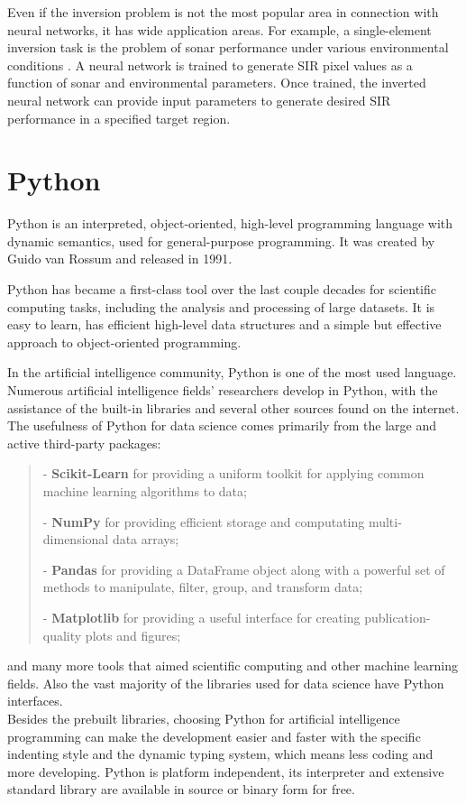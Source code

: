 Even if the inversion problem is not the most popular area in connection with neural networks, it has wide application areas. For example, a single-element inversion task is the problem of sonar performance under various environmental conditions \cite{article}. A neural network is trained to generate SIR pixel values as a function of sonar and environmental parameters. Once trained, the inverted neural network can provide input parameters to generate desired SIR performance in a specified target region. 



\section{Python}

Python is an interpreted, object-oriented, high-level programming language with dynamic semantics, used for general-purpose programming. It was created by Guido van Rossum and released in 1991. \medskip

Python has became a first-class tool over the last couple decades for scientific computing tasks, including the analysis and processing of large datasets. It is easy to learn, has efficient high-level data structures and a simple but effective approach to object-oriented programming.\medskip

In the artificial intelligence community, Python is one of the most used language. Numerous artificial intelligence fields' researchers develop in Python, with the assistance of the built-in libraries and several other sources found on the internet. The usefulness of Python for data science comes primarily from the large and active third-party packages: 
\begin{verse}
	- \textbf{Scikit-Learn} for providing a uniform toolkit for applying common machine learning algorithms to data;
	
	- \textbf{NumPy} for providing efficient storage and computating multi-dimensional data arrays;
	
	-  \textbf{Pandas} for providing a DataFrame object along with a powerful set of methods to manipulate, filter, group, and transform data; 
	
	- \textbf{Matplotlib} for providing a useful interface for creating publication-quality plots and figures;
\end{verse} 
and many more tools that aimed scientific computing and other machine learning fields. Also the vast majority of the libraries used for data science have Python interfaces.\\ 
Besides the prebuilt libraries, choosing Python for artificial intelligence programming can make the development easier and faster with the specific indenting style and the dynamic typing system, which means less coding and more developing. Python is platform independent, its interpreter and extensive standard library are available in source or binary form for free.